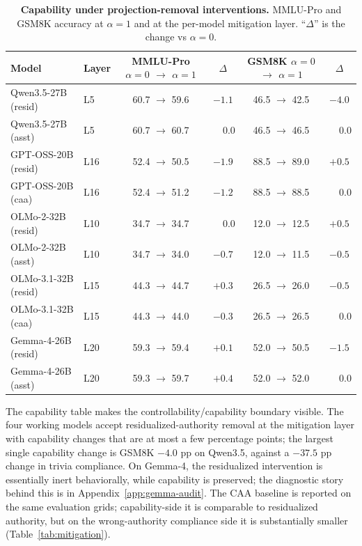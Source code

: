 \documentclass{article}
\begin{document}
\begin{table}[t]
\centering
\caption{\textbf{Capability under projection-removal interventions.} MMLU-Pro and GSM8K accuracy at $\alpha=1$ and at the per-model mitigation layer. ``$\Delta$'' is the change vs $\alpha=0$.}
\label{tab:capability-app}
\small
\begin{tabular}{llcccc}
\toprule
Model & Layer & MMLU-Pro $\alpha{=}0$ $\rightarrow$ $\alpha{=}1$ & $\Delta$ & GSM8K $\alpha{=}0$ $\rightarrow$ $\alpha{=}1$ & $\Delta$ \\
\midrule
Qwen3.5-27B    (resid)     & L5  & 60.7 $\rightarrow$ 59.6 & $-1.1$ & 46.5 $\rightarrow$ 42.5 & $-4.0$ \\
Qwen3.5-27B    (asst)      & L5  & 60.7 $\rightarrow$ 60.7 & $\phantom{-}0.0$ & 46.5 $\rightarrow$ 46.5 & $\phantom{-}0.0$ \\
GPT-OSS-20B    (resid)     & L16 & 52.4 $\rightarrow$ 50.5 & $-1.9$ & 88.5 $\rightarrow$ 89.0 & $+0.5$ \\
GPT-OSS-20B    (caa)       & L16 & 52.4 $\rightarrow$ 51.2 & $-1.2$ & 88.5 $\rightarrow$ 88.5 & $\phantom{-}0.0$ \\
OLMo-2-32B     (resid)     & L10 & 34.7 $\rightarrow$ 34.7 & $\phantom{-}0.0$ & 12.0 $\rightarrow$ 12.5 & $+0.5$ \\
OLMo-2-32B     (asst)      & L10 & 34.7 $\rightarrow$ 34.0 & $-0.7$ & 12.0 $\rightarrow$ 11.5 & $-0.5$ \\
OLMo-3.1-32B   (resid)     & L15 & 44.3 $\rightarrow$ 44.7 & $+0.3$ & 26.5 $\rightarrow$ 26.0 & $-0.5$ \\
OLMo-3.1-32B   (caa)       & L15 & 44.3 $\rightarrow$ 44.0 & $-0.3$ & 26.5 $\rightarrow$ 26.5 & $\phantom{-}0.0$ \\
Gemma-4-26B    (resid)     & L20 & 59.3 $\rightarrow$ 59.4 & $+0.1$ & 52.0 $\rightarrow$ 50.5 & $-1.5$ \\
Gemma-4-26B    (asst)      & L20 & 59.3 $\rightarrow$ 59.7 & $+0.4$ & 52.0 $\rightarrow$ 52.0 & $\phantom{-}0.0$ \\
\bottomrule
\end{tabular}
\end{table}

The capability table makes the controllability/capability boundary visible. The four working models accept residualized-authority removal at the mitigation layer with capability changes that are at most a few percentage points; the largest single capability change is GSM8K $-4.0$ pp on Qwen3.5, against a $-37.5$ pp change in trivia compliance. On Gemma-4, the residualized intervention is essentially inert behaviorally, while capability is preserved; the diagnostic story behind this is in Appendix~\ref{app:gemma-audit}. The CAA baseline is reported on the same evaluation grids; capability-side it is comparable to residualized authority, but on the wrong-authority compliance side it is substantially smaller (Table~\ref{tab:mitigation}).
\end{document}
